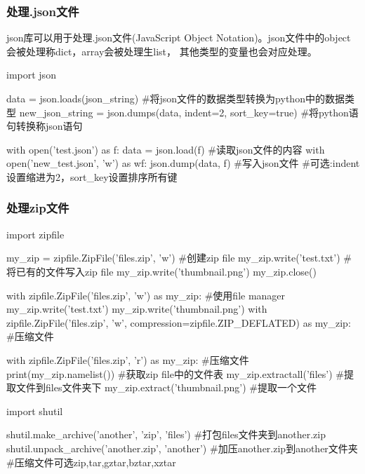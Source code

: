     \subsubsection{处理.json文件}
      json库可以用于处理.json文件(JavaScript Object Notation)。json文件中的object会被处理称dict，array会被处理生list，
      其他类型的变量也会对应处理。
      \begin{codeblock}[language=python, caption={json module}]
        import json

        data = json.loads(json_string) #将json文件的数据类型转换为python中的数据类型
        new_json_string = json.dumps(data, indent=2, sort_key=true) #将python语句转换称json语句

        with open('test.json') as f:
            data = json.load(f) #读取json文件的内容
        with open('new_test.json', 'w') as wf:
            json.dump(data, f) #写入json文件
        #可选:indent设置缩进为2，sort\_key设置排序所有键
      \end{codeblock}

    \subsubsection{处理zip文件}
      \begin{codeblock}[language=python, caption={zip file}]
        import zipfile
        
        my_zip = zipfile.ZipFile('files.zip', 'w') #创建zip file
        my_zip.write('test.txt') #将已有的文件写入zip file
        my_zip.write('thumbnail.png')
        my_zip.close()

        with zipfile.ZipFile('files.zip', 'w') as my_zip: #使用file manager
            my_zip.write('test.txt')
            my_zip.write('thumbnail.png')
        with zipfile.ZipFile('files.zip', 'w', compression=zipfile.ZIP_DEFLATED) as my_zip: #压缩文件

        with zipfile.ZipFile('files.zip', 'r') as my_zip: #压缩文件
            print(my_zip.namelist()) #获取zip file中的文件表
            my_zip.extractall('files') #提取文件到files文件夹下
            my_zip.extract('thumbnail.png') #提取一个文件

        import shutil

        shutil.make_archive('another', 'zip', 'files') #打包files文件夹到another.zip
        shutil.unpack_archive('another.zip', 'another') #加压another.zip到another文件夹
        #压缩文件可选zip,tar,gztar,bztar,xztar
      \end{codeblock}
